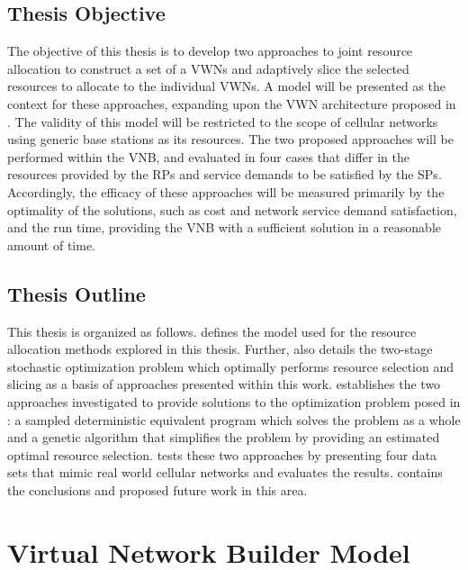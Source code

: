 \documentclass[12pt,dvipsnames]{report}
\begin{document}
\section{Thesis Objective} \label{sec:objective}

The objective of this thesis is to develop two approaches to joint resource allocation to construct a set of a VWNs and adaptively slice the selected resources to allocate to the individual VWNs.  A model will be presented as the context for these approaches, expanding upon the VWN architecture proposed in .  The validity of this model will be restricted to the scope of cellular networks using generic base stations as its resources.  The two proposed approaches will be performed within the VNB, and evaluated in four cases that differ in the resources provided by the RPs and service demands to be satisfied by the SPs.  Accordingly, the efficacy of these approaches will be measured primarily by the optimality of the solutions, such as cost and network service demand satisfaction, and the run time, providing the VNB with a sufficient solution in a reasonable amount of time.

\section{Thesis Outline} \label{sec:outline}

This thesis is organized as follows.   defines the model used for the resource allocation methods explored in this thesis.  Further,  also details the two-stage stochastic optimization problem which optimally performs resource selection and slicing as a basis of approaches presented within this work.   establishes the two approaches investigated to provide solutions to the optimization problem posed in : a sampled deterministic equivalent program which solves the problem as a whole and a genetic algorithm that simplifies the problem by providing an estimated optimal resource selection.   tests these two approaches by presenting four data sets that mimic real world cellular networks and evaluates the results.   contains the conclusions and proposed future work in this area.
\fi

\iftrue
\pagebreak
\chapter{Virtual Network Builder Model} \label{ch:vnbmodel}
\end{document}
